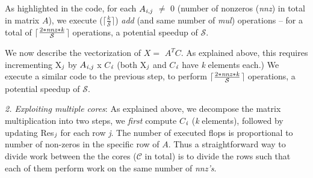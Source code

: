      \vspace*{-0.05in}
     As highlighted in the code, for each
     $A_{{\it{i}},{\it{j}}}$ $\neq$ 0 (number of nonzeros ({\it{nnz}}) in total in matrix $A$), 
     we execute ($\lceil$$\frac{k}{\mathcal{S}}$$\rceil$) 
     {\it{add}} (and same number of {\it{mul}}) operations -- for a
     total of
     $\lceil$$\frac{2*{\it{nnz}}*{\it{k}}}{\mathcal{S}}$$\rceil$ operations,
     a potential speedup of $\mathcal{S}$.  

     We now describe the vectorization of  $X =$ $A^TC$. %
     As explained above, this
     requires incrementing X$_{{\it{j}}}$ 
     by $A_{{\it{i}},{\it{j}}}$ x $C$$_{{\it{i}}}$ 
     (both X$_{{\it{j}}}$ and $C$$_{{\it{i}}}$ have {\it{k}} elements each.)
    We execute a similar code to the previous step, to perform 
    $\lceil$$\frac{2*{\it{nnz}}*{\it{k}}}{\mathcal{S}}$$\rceil$
    operations,
    a potential speedup of $\mathcal{S}$.

    \iffalse
    On some architectures, vector loads and stores are faster if
    memory addresses are 256-bit (or 512-bit aligned). 
    Since all our memory loads/stores start with each row of any
    matrix, we assign {\it{k}}  to be a multiple of 8, and align the
    starting addresses of all matrices to take advantage of such
    scenarios.
    \fi
    


     \vspace*{0.1in}
     {\it{2. Exploiting multiple cores}}: As explained above, we
     decompose the matrix multiplication into two steps, %
     we {\it{first}} compute
     $C$$_{{\it{i}}}$ ({\it{k}} elements), followed by updating 
     Res$_{{\it{j}}}$ for each row {\it{j}}. The number of executed 
     flops %
     is proportional to number of
     non-zeros in the specific row of $A$. Thus a straightforward way
     to divide work between the the cores
     ($\mathcal{C}$ in total) is to divide the rows %
     such that each of them perform work on the same number of {\it{nnz's}}. 

